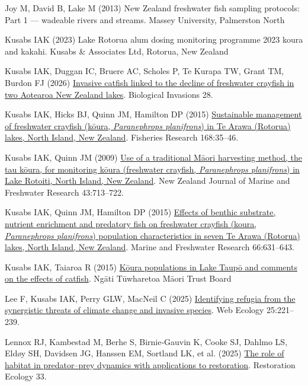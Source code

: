\documentclass[
  letterpaper,
  DIV=11,
  numbers=noendperiod]{scrartcl}
\newlength{\cslhangindent}
\newenvironment{CSLReferences}[2] %
 {\begin{list}{}{%
  \setlength{\itemindent}{0pt}
  \setlength{\leftmargin}{0pt}
  \setlength{\parsep}{0pt}
  \ifodd #1
   \setlength{\leftmargin}{\cslhangindent}
   \setlength{\itemindent}{-1\cslhangindent}
  \fi
  \setlength{\itemsep}{#2\baselineskip}}}
 {\end{list}}
\begin{document}
\begin{CSLReferences}{1}{1}
Joy M, David B, Lake M (2013) New {Zealand} freshwater fish sampling
protocols: Part 1 --- wadeable rivers and streams. Massey University,
Palmerston North

Kusabs IAK (2023) {Lake Rotorua} alum dosing monitoring programme 2023
koura and kakahi. Kusabs \& Associates Ltd, Rotorua, New Zealand

Kusabs IAK, Duggan IC, Bruere AC, Scholes P, Te Kurapa TW, Grant TM,
Burdon FJ (2026)
\href{https://doi.org/10.1007/s10530-026-03852-0}{Invasive catfish
linked to the decline of freshwater crayfish in two {Aotearoa New
Zealand} lakes}. Biological Invasions 28.

Kusabs IAK, Hicks BJ, Quinn JM, Hamilton DP (2015)
\href{https://doi.org/10.1016/j.fishres.2015.03.015}{Sustainable
management of freshwater crayfish (kōura, {\emph{Paranephrops
planifrons}}) in {Te Arawa} ({Rotorua}) lakes, {North Island}, {New
Zealand}}. Fisheries Research 168:35--46.

Kusabs IAK, Quinn JM (2009)
\href{https://doi.org/10.1080/00288330909510036}{Use of a traditional
{Māori} harvesting method, the tau k{ō}ura, for monitoring k{ō}ura
(freshwater crayfish, {\emph{Paranephrops planifrons}}) in {Lake
Rotoiti}, {North Island, New Zealand}}. New Zealand Journal of Marine
and Freshwater Research 43:713--722.

Kusabs IAK, Quinn JM, Hamilton DP (2015)
\href{https://doi.org/10.1071/mf14148}{Effects of benthic substrate,
nutrient enrichment and predatory fish on freshwater crayfish (koura,
{\emph{Paranephrops planifrons}}) population characteristics in seven
{Te Arawa} ({Rotorua}) lakes, {North Island}, {New Zealand}}. Marine and
Freshwater Research 66:631--643.

Kusabs IAK, Taiaroa R (2015)
\href{https://doi.org/10.13140/RG.2.2.12471.89761}{K{ō}ura populations
in {Lake Taup{ō}} and comments on the effects of catfish}. Ngāti
Tūwharetoa Māori Trust Board

Lee F, Kusabs IAK, Perry GLW, MacNeil C (2025)
\href{https://doi.org/10.5194/we-25-221-2025}{Identifying refugia from
the synergistic threats of climate change and invasive species}. Web
Ecology 25:221--239.

Lennox RJ, Kambestad M, Berhe S, Birnie‐Gauvin K, Cooke SJ, Dahlmo LS,
Eldøy SH, Davidsen JG, Hanssen EM, Sortland LK, et al. (2025)
\href{https://doi.org/10.1111/rec.14354}{The role of habitat in
predator--prey dynamics with applications to restoration}. Restoration
Ecology 33.


\end{CSLReferences}
\end{document}
